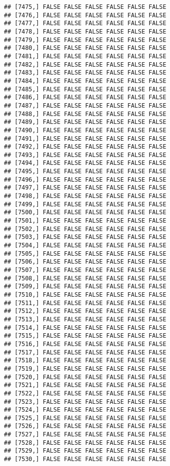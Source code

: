 \documentclass[
]{article}
\begin{document}
\begin{verbatim}
## [7475,] FALSE FALSE FALSE FALSE FALSE FALSE
## [7476,] FALSE FALSE FALSE FALSE FALSE FALSE
## [7477,] FALSE FALSE FALSE FALSE FALSE FALSE
## [7478,] FALSE FALSE FALSE FALSE FALSE FALSE
## [7479,] FALSE FALSE FALSE FALSE FALSE FALSE
## [7480,] FALSE FALSE FALSE FALSE FALSE FALSE
## [7481,] FALSE FALSE FALSE FALSE FALSE FALSE
## [7482,] FALSE FALSE FALSE FALSE FALSE FALSE
## [7483,] FALSE FALSE FALSE FALSE FALSE FALSE
## [7484,] FALSE FALSE FALSE FALSE FALSE FALSE
## [7485,] FALSE FALSE FALSE FALSE FALSE FALSE
## [7486,] FALSE FALSE FALSE FALSE FALSE FALSE
## [7487,] FALSE FALSE FALSE FALSE FALSE FALSE
## [7488,] FALSE FALSE FALSE FALSE FALSE FALSE
## [7489,] FALSE FALSE FALSE FALSE FALSE FALSE
## [7490,] FALSE FALSE FALSE FALSE FALSE FALSE
## [7491,] FALSE FALSE FALSE FALSE FALSE FALSE
## [7492,] FALSE FALSE FALSE FALSE FALSE FALSE
## [7493,] FALSE FALSE FALSE FALSE FALSE FALSE
## [7494,] FALSE FALSE FALSE FALSE FALSE FALSE
## [7495,] FALSE FALSE FALSE FALSE FALSE FALSE
## [7496,] FALSE FALSE FALSE FALSE FALSE FALSE
## [7497,] FALSE FALSE FALSE FALSE FALSE FALSE
## [7498,] FALSE FALSE FALSE FALSE FALSE FALSE
## [7499,] FALSE FALSE FALSE FALSE FALSE FALSE
## [7500,] FALSE FALSE FALSE FALSE FALSE FALSE
## [7501,] FALSE FALSE FALSE FALSE FALSE FALSE
## [7502,] FALSE FALSE FALSE FALSE FALSE FALSE
## [7503,] FALSE FALSE FALSE FALSE FALSE FALSE
## [7504,] FALSE FALSE FALSE FALSE FALSE FALSE
## [7505,] FALSE FALSE FALSE FALSE FALSE FALSE
## [7506,] FALSE FALSE FALSE FALSE FALSE FALSE
## [7507,] FALSE FALSE FALSE FALSE FALSE FALSE
## [7508,] FALSE FALSE FALSE FALSE FALSE FALSE
## [7509,] FALSE FALSE FALSE FALSE FALSE FALSE
## [7510,] FALSE FALSE FALSE FALSE FALSE FALSE
## [7511,] FALSE FALSE FALSE FALSE FALSE FALSE
## [7512,] FALSE FALSE FALSE FALSE FALSE FALSE
## [7513,] FALSE FALSE FALSE FALSE FALSE FALSE
## [7514,] FALSE FALSE FALSE FALSE FALSE FALSE
## [7515,] FALSE FALSE FALSE FALSE FALSE FALSE
## [7516,] FALSE FALSE FALSE FALSE FALSE FALSE
## [7517,] FALSE FALSE FALSE FALSE FALSE FALSE
## [7518,] FALSE FALSE FALSE FALSE FALSE FALSE
## [7519,] FALSE FALSE FALSE FALSE FALSE FALSE
## [7520,] FALSE FALSE FALSE FALSE FALSE FALSE
## [7521,] FALSE FALSE FALSE FALSE FALSE FALSE
## [7522,] FALSE FALSE FALSE FALSE FALSE FALSE
## [7523,] FALSE FALSE FALSE FALSE FALSE FALSE
## [7524,] FALSE FALSE FALSE FALSE FALSE FALSE
## [7525,] FALSE FALSE FALSE FALSE FALSE FALSE
## [7526,] FALSE FALSE FALSE FALSE FALSE FALSE
## [7527,] FALSE FALSE FALSE FALSE FALSE FALSE
## [7528,] FALSE FALSE FALSE FALSE FALSE FALSE
## [7529,] FALSE FALSE FALSE FALSE FALSE FALSE
## [7530,] FALSE FALSE FALSE FALSE FALSE FALSE

\end{verbatim}
\end{document}
